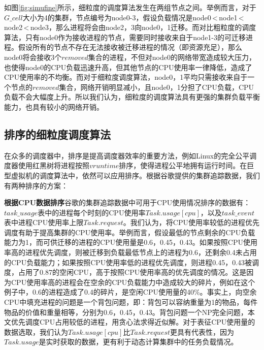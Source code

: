 如图\ref{fig:simufine}所示，细粒度的调度算法发生在两组节点之间。举例而言，对于$G\_cell$大小为4的集群，节点编号为node0-3，假设负载情况是node0\,<\,node1\,<\,node2\,<\,node3，那么进程将会由node2，3向node0，1迁移。而对比粗粒度的调度算法，只有node0作为接收进程的节点，需要同时接收来自于node1-3的可迁移进程。假设所有的节点不存在无法接收被迁移进程的情况（即资源充足），那么node0将会接收3个$removed$集合的进程，不但对node0的网络带宽造成较大压力，也使得node0的CPU负载迅速升高，但其他节点的CPU使用率一律降低，造成了CPU使用率的不均衡。而对于细粒度调度算法，node0，1平均只需接收来自于一个节点的$removed$集合，网络开销明显减小，且node0，1分担了CPU负载，CPU负载不会大幅度上升。所以我们认为，细粒度的调度算法具有更强的集群负载平衡能力，也具有较小的网络开销。

\subsection{排序的细粒度调度算法}
在众多的调度器中，排序是提高调度器效率的重要方法，例如Linux\cite{linux}的完全公平调度器使用红黑树将进程按照$vruntime$排序，使得进程公平地拥有运行时间。在巨型虚拟机的调度算法中，依然可以应用排序。根据谷歌提供的集群追踪数据，我们有两种排序的方案：

\noindent\textbf{根据CPU数据排序}\quad 谷歌的集群追踪数据中可用于CPU使用情况排序的数据有：$task\_usage$表中的进程每个时刻的CPU使用率$Task.usage[cpu]$，以及$task\_event$表中进程CPU使用率上限$Task.request$。我们认为，将CPU使用率较低的进程优先调度有助于提高集群的CPU使用率。举例而言，假设最低的节点剩余的CPU负载能力为1，而可供迁移的进程的CPU使用量是0.6，0.45，0.43。如果按照CPU使用率高的进程优先调度，则被迁移到负载最低节点上的进程为0.6，还剩余0.4未占用的CPU负载能力；如果按照CPU使用率低的进程优先调度，则进程0.45，0.43被调度，占用了0.87的空闲CPU，高于按照CPU使用率高的优先调度的情况。这是因为CPU使用率高的进程会在空余的CPU负载能力中造成较大的碎片，例如在这个例子中，0.6的进程造成了0.4的碎片，是空闲CPU使用量的40\%。事实上，向空余CPU中填充进程的问题是一个背包问题，即：背包可以容纳重量为1的物品，每件物品的价值和重量相等，分别为0.6，0.45，0.43。背包问题一个NP完全问题，本文优先调度CPU占用较低的进程，用贪心法求得近似解。对于表征CPU使用量的数据选取，我们认为$Task.usage[cpu]$比$Task.request$更具有代表性，因为$Task.usage$是实时获取的数据，更有利于动态计算集群中的任务负载情况。

